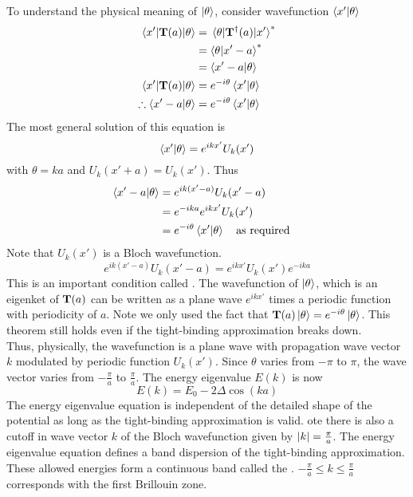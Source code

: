 \documentclass[12pt,a4paper,titlepage]{article}
\newcommand{\ul}[1]{\underline{\smash{#1}}} %
\begin{document}
To understand the physical meaning of $\ket{\theta}$, consider wavefunction $\ip{x'}{\theta}$
\begin{equation}
\begin{aligned}
\mel{x'}{\vb{T}(a)}{\theta}&=\mel{\theta}{\vb{T}^{\dagger}(a)}{x'}^{*}\\
&=\ip{\theta}{x'-a}^{*}\\
&=\ip{x'-a}{\theta}\\
\mel{x'}{\vb{T}(a)}{\theta}&=e^{-i\theta}\ip{x'}{\theta}\\
\therefore \ip{x'-a}{\theta}&=e^{-i\theta}\ip{x'}{\theta}
\end{aligned}
\end{equation}
The most general solution of this equation is
\begin{equation}
\ip{x'}{\theta}=e^{ikx'}U_{k}(x')
\end{equation}
with $\theta=ka$ and $U_{k}(x'+a)=U_{k}(x')$. Thus
\begin{equation}
\begin{aligned}
\ip{x'-a}{\theta}&=e^{ik(x'-a)}U_{k}(x'-a)\\
&=e^{-ika}e^{ikx'}U_{k}(x')\\
&=e^{-i\theta}\ip{x'}{\theta}\qq{as required}
\end{aligned}
\end{equation}
Note that $U_{k}(x')$ is a Bloch wavefunction.
\begin{equation}
e^{ik(x'-a)}U_{k}(x'-a)=e^{ikx'}U_{k}(x')e^{-ika}
\end{equation}
This is an important condition called \ul{Bloch's theorem}. The wavefunction of $\ket{\theta}$, which is an eigenket of $\vb{T}(a)$ can be written as a plane wave $e^{ikx'}$ times a periodic function with periodicity of $a$. Note we only used the fact that $\vb{T}(a)\ket{\theta}=e^{-i\theta}\ket{\theta}$. This theorem still holds even if the tight-binding approximation breaks down.\\

Thus, physically, the wavefunction is a plane wave with propagation wave vector $k$ modulated by periodic function $U_{k}(x')$. Since $\theta$ varies from $-\pi$ to $\pi$, the wave vector varies from $-\frac{\pi}{a}$ to $\frac{\pi}{a}$. The energy eigenvalue $E(k)$ is now
\begin{equation}
E(k)=E_{0}-2\Delta\cos(ka)
\end{equation}
The energy eigenvalue equation is independent of the detailed shape of the potential as long as the tight-binding approximation is valid. ote there is also a cutoff in wave vector $k$ of the Bloch wavefunction given by $\abs{k}=\frac{\pi}{a}$. The energy eigenvalue equation defines a band dispersion of the tight-binding approximation. These allowed energies form a continuous band called the \ul{Brillouin zone}. $-\frac{\pi}{a}\leq k\leq \frac{\pi}{a}$ corresponds with the first Brillouin zone.\\
\end{document}
